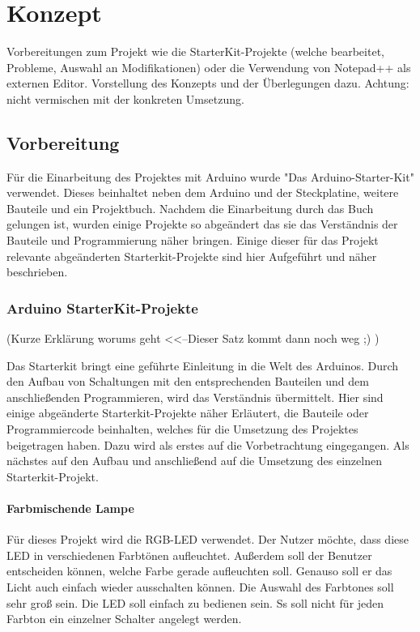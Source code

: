 \chapter{Konzept}

Vorbereitungen zum Projekt wie die StarterKit-Projekte (welche bearbeitet, Probleme, Auswahl an Modifikationen) oder die Verwendung von Notepad++ als externen Editor. Vorstellung des Konzepts und der Überlegungen dazu. Achtung: nicht vermischen mit der konkreten Umsetzung.

\section{Vorbereitung}
Für die Einarbeitung des Projektes mit Arduino wurde "Das Arduino-Starter-Kit" verwendet. Dieses beinhaltet neben dem Arduino und der Steckplatine, weitere Bauteile und ein Projektbuch. Nachdem die Einarbeitung durch das Buch gelungen ist, wurden einige Projekte so abgeändert das sie das Verständnis der Bauteile und Programmierung näher bringen. Einige dieser für das Projekt relevante abgeänderten Starterkit-Projekte sind hier Aufgeführt und näher beschrieben.


\subsection{Arduino StarterKit-Projekte}
(Kurze Erklärung worums geht <<--Dieser Satz kommt dann noch weg ;) )

Das Starterkit bringt eine geführte Einleitung in die Welt des Arduinos. Durch den Aufbau von Schaltungen mit den entsprechenden Bauteilen und dem anschließenden Programmieren, wird das Verständnis übermittelt.
Hier sind einige abgeänderte Starterkit-Projekte näher Erläutert, die Bauteile oder Programmiercode beinhalten, welches für die Umsetzung des  Projektes beigetragen haben. Dazu wird als erstes auf die Vorbetrachtung eingegangen. Als nächstes auf den Aufbau und anschließend auf die Umsetzung des einzelnen Starterkit-Projekt.


\subsubsection{Farbmischende Lampe}

Für dieses Projekt wird die RGB-LED verwendet. Der Nutzer möchte, dass diese LED in verschiedenen Farbtönen aufleuchtet. Außerdem soll der Benutzer entscheiden können, welche Farbe gerade aufleuchten soll. Genauso soll er das Licht auch einfach wieder ausschalten können. Die Auswahl des Farbtones soll sehr groß sein. Die LED soll einfach zu bedienen sein. Ss soll nicht für jeden Farbton ein einzelner Schalter angelegt werden.
\\

